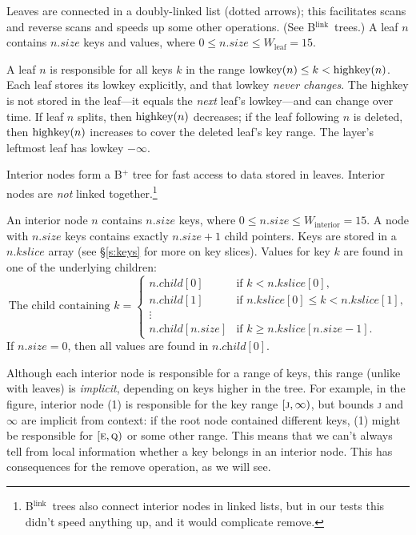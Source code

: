 \documentclass[11pt]{article}
\newcommand{\V}[1]{\textit{#1}}
\newcommand{\N}[1]{\text{\upshape{#1}}}
\newcommand{\Blink}{B\(^{\text{link}}\)}
\newcommand{\LEAFWIDTH}{\ensuremath{W_\text{leaf}}}
\newcommand{\INTERIORWIDTH}{\ensuremath{W_\text{interior}}}
\begin{document}
Leaves are connected in a doubly-linked list (dotted arrows); this
facilitates scans and reverse scans and speeds up some other operations.
(See \Blink\ trees.) A leaf \(n\) contains \(n.\V{size}\) keys and
values, where \(0 \leq n.\V{size} \leq \LEAFWIDTH = 15\).

A leaf \(n\) is responsible for all keys \(k\) in the range
\(\N{lowkey}(n) \leq k < \N{highkey}(n)\). Each leaf stores its lowkey
explicitly, and that lowkey \emph{never changes}. The highkey is not
stored in the leaf---it equals the \emph{next} leaf's lowkey---and can
change over time. If leaf \(n\) splits, then \(\N{highkey}(n)\)
decreases; if the leaf following \(n\) is deleted, then
\(\N{highkey}(n)\) increases to cover the deleted leaf's key range. The
layer's leftmost leaf has lowkey \(-\infty\).

Interior nodes form a B$^+$ tree for fast access to data stored in
leaves. Interior nodes are \emph{not} linked
together.\footnote{\Blink\ trees also connect interior nodes in linked
lists, but in our tests this didn't speed anything up, and it would
complicate remove.}

An interior node \(n\) contains \(n.\V{size}\) keys, where \(0 \leq
n.\V{size} \leq \INTERIORWIDTH = 15\). A node with \(n.\V{size}\) keys
contains exactly \(n.\V{size} + 1\) child pointers. Keys are stored in a
\(n.\V{kslice}\) array (see \S\ref{s:keys} for more on key slices).
Values for key \(k\) are found in one of the underlying children:
%
\[
\text{The child containing \(k\)} =
\begin{cases}
n.\V{child}[0] & \text{if \(k < n.\V{kslice}[0]\),} \\
n.\V{child}[1] & \text{if \(n.\V{kslice}[0] \leq k < n.\V{kslice}[1]\),} \\
\vdots \\
n.\V{child}[n.\V{size}] & \text{if \(k \geq n.\V{kslice}[n.\V{size}-1]\).}
\end{cases}
\]
%
If \(n.\V{size} = 0\), then all values are found in \(n.\V{child}[0]\).

Although each interior node is responsible for a range of keys, this
range (unlike with leaves) is \emph{implicit}, depending on keys higher
in the tree. For example, in the figure, interior node (1) is
responsible for the key range \([\textsc{j}, \infty)\), but bounds
\textsc{j} and \(\infty\) are implicit from context: if the root node
contained different keys, (1) might be responsible for
\([\textsc{e},\textsc{q})\) or some other range. This means that we
can't always tell from local information whether a key belongs in an
interior node. This has consequences for the remove operation, as we
will see.
\end{document}

